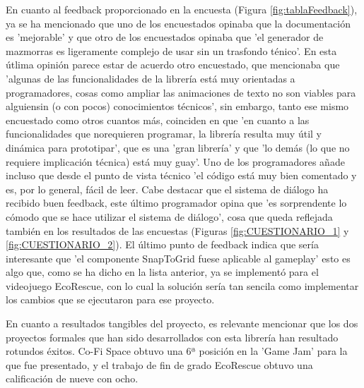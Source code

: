En cuanto al feedback proporcionado en la encuesta (Figura \ref{fig:tablaFeedback}), ya se ha mencionado que uno de los encuestados opinaba que la documentación es 'mejorable' y que otro de los encuestados opinaba 
que 'el generador de mazmorras es ligeramente complejo de usar sin un trasfondo ténico'. En esta útlima opinión parece estar de acuerdo otro encuestado, que mencionaba que 'algunas de las funcionalidades de la
 librería está muy orientadas a programadores, cosas como ampliar las animaciones de texto no son viables para alguiensin (o con pocos) conocimientos técnicos', sin embargo, tanto ese mismo encuestado como otros 
 cuantos más, coinciden en que 'en cuanto a las funcionalidades que norequieren programar, la librería resulta muy útil y dinámica para prototipar', que es una 'gran librería' y que 'lo demás (lo que no requiere
 implicación técnica) está muy guay'. Uno de los programadores añade incluso que desde el punto de vista técnico 'el código está muy bien comentado y es, por lo general, fácil de leer. Cabe destacar que el sistema de diálogo ha recibido buen feedback, este último programador opina que 'es sorprendente lo cómodo que se hace utilizar el sistema de diálogo', cosa que queda reflejada también
  en los resultados de las encuestas (Figuras \ref{fig:CUESTIONARIO_1} y \ref{fig:CUESTIONARIO_2}). El último punto de feedback indica que sería interesante que 'el componente SnapToGrid fuese aplicable al gameplay'
  esto es algo que, como se ha dicho en la lista anterior, ya se implementó para el videojuego EcoRescue, con lo cual la solución sería tan sencila como implementar los cambios que se ejecutaron para ese proyecto.

En cuanto a resultados tangibles del proyecto, es relevante mencionar que los dos proyectos formales que han sido desarrollados con esta librería han resultado rotundos éxitos. Co-Fi Space obtuvo una 6ª posición en 
la 'Game Jam' para la que fue presentado, y el trabajo de fin de grado EcoRescue obtuvo una calificación de nueve con ocho. 
